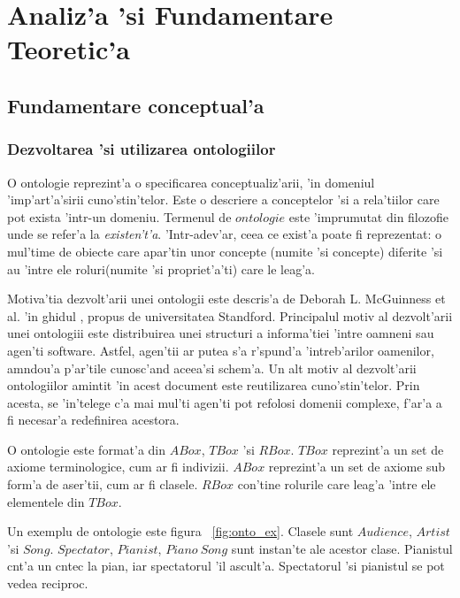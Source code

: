 \documentclass[12pt,a4paper,twoside]{report}
\begin{document}
\chapter{Analiz'a 'si Fundamentare Teoretic'a}
\label{ch:analysis}

\section{Fundamentare conceptual'a}
\subsection{Dezvoltarea 'si utilizarea ontologiilor}


O ontologie reprezint'a o specificarea  conceptualiz'arii, 'in domeniul 'imp'art'a'sirii cuno'stin'telor. Este o descriere a conceptelor 'si a rela'tiilor care pot exista 'intr-un domeniu. Termenul de $ontologie$ este 'imprumutat din filozofie unde se refer'a la {\it existen't'a}. 'Intr-adev'ar, ceea ce exist'a poate fi reprezentat: o mul'time de obiecte care apar'tin unor concepte (numite 'si concepte) diferite 'si au 'intre ele roluri(numite 'si propriet'a'ti) care le leag'a.

Motiva'tia dezvolt'arii unei ontologii este descris'a de Deborah L. McGuinness et al. 'in ghidul \cite{protege_ontology}, propus de universitatea Standford. Principalul motiv al dezvolt'arii unei ontologiii este distribuirea unei structuri a informa'tiei 'intre oamneni sau agen'ti software. Astfel, agen'tii ar putea s'a r'spund'a 'intreb'arilor oamenilor, am\ia ndou'a p'ar'tile cunosc'and aceea'si schem'a. Un alt motiv al dezvolt'arii ontologiilor amintit 'in acest document este reutilizarea cuno'stin'telor. Prin acesta, se 'in'telege c'a mai mul'ti agen'ti pot refolosi domenii complexe, f'ar'a a fi necesar'a redefinirea acestora. 

O ontologie este format'a din $ABox$, $TBox$  'si $RBox$. $TBox$ reprezint'a un set de axiome terminologice, cum ar fi indivizii. $ABox$ reprezint'a un set de axiome sub form'a de aser'tii, cum ar fi clasele. $RBox$ con'tine rolurile care leag'a 'intre ele elementele din $TBox$. 

Un exemplu de ontologie este figura ~\ref{fig:onto_ex}. Clasele sunt $Audience$, $Artist$ 'si $Song$. $Spectator$, $Pianist$, $Piano\ Song$  sunt instan'te ale acestor clase. Pianistul c\ia nt'a un c\ia ntec la pian, iar spectatorul 'il ascult'a. Spectatorul 'si pianistul se pot vedea reciproc.
\end{document}
